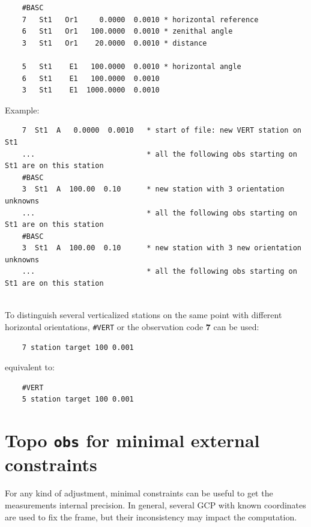 \begin{verbatim}
    #BASC
    7   St1   Or1     0.0000  0.0010 * horizontal reference
    6   St1   Or1   100.0000  0.0010 * zenithal angle
    3   St1   Or1    20.0000  0.0010 * distance

    5   St1    E1   100.0000  0.0010 * horizontal angle
    6   St1    E1   100.0000  0.0010
    3   St1    E1  1000.0000  0.0010
\end{verbatim}



Example:
\begin{verbatim}
    7  St1  A   0.0000  0.0010   * start of file: new VERT station on St1
    ...                          * all the following obs starting on St1 are on this station
    #BASC
    3  St1  A  100.00  0.10      * new station with 3 orientation unknowns
    ...                          * all the following obs starting on St1 are on this station
    #BASC
    3  St1  A  100.00  0.10      * new station with 3 new orientation unknowns
    ...                          * all the following obs starting on St1 are on this station
    
\end{verbatim}

To distinguish several verticalized stations on the same point with different horizontal orientations, \texttt{\#VERT} or the observation code {\textbf 7} can be used:

\begin{verbatim}
    7 station target 100 0.001
\end{verbatim}

equivalent to:

\begin{verbatim}
    #VERT
    5 station target 100 0.001
\end{verbatim}


\section{Topo \texttt{obs} for minimal external constraints}

For any kind of adjustment, minimal constraints can be useful to get the measurements internal precision.
In general, several GCP with known coordinates are used to fix the frame, but their inconsistency may
impact the computation.

